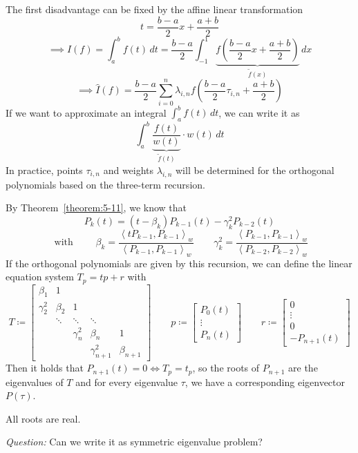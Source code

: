 \documentclass[a4paper]{article}
\numberwithin{lecref}{section}
\theoremstyle{break}
\newcommand{\IP}[2]{\left\langle#1, #2\right\rangle}
\begin{document}
The first disadvantage can be fixed by the affine linear transformation
\[ t = \frac{b - a}{2} x + \frac{a + b}{2} \]
\[ \implies I(f) = \int_a^b f(t) \, dt = \frac{b - a}{2} \int_{-1}^1 \underbrace{f\left(\frac{b - a}{2} x + \frac{a + b}{2}\right)}_{\tilde f(x)} \, dx \]
\[ \implies \hat{I}(f) = \frac{b - a}{2} \sum_{i=0}^n \lambda_{i,n} f\left(\frac{b - a}{2} \tau_{i,n} + \frac{a + b}{2}\right) \]
If we want to approximate an integral $\int_a^b f(t) \, dt$, we can write it as
\[ \int_a^b \underbrace{\frac{f(t)}{w(t)}}_{\tilde f(t)} \cdot w(t) \, dt \]
In practice, points $\tau_{i,n}$ and weights $\lambda_{i,n}$ will be determined for the orthogonal polynomials based on the three-term recursion.

By Theorem~\ref{theorem:5-11}, we know that
\[ P_k(t) = (t - \beta_k) P_{k-1}(t) - \gamma_k^2 P_{k-2}(t) \]
\[ \text{ with } \qquad \beta_k = \frac{\IP{t P_{k-1}}{P_{k-1}}_w}{\IP{P_{k-1}}{P_{k-1}}_w} \qquad \gamma_k^2 = \frac{\IP{P_{k-1}}{P_{k-1}}_w}{\IP{P_{k-2}}{P_{k-2}}_w} \]
If the orthogonal polynomials are given by this recursion, we can define the linear equation system $T_p = t p + r$ with
\[
  T \coloneqq \begin{bmatrix}
    \beta_1    & 1       &            &                & \\
    \gamma_2^2 & \beta_2 & 1          &                & \\
               & \ddots  & \ddots     & \ddots         & \\
               &         & \gamma_n^2 & \beta_n        & 1 \\
               &         &            & \gamma_{n+1}^2 & \beta_{n+1}
  \end{bmatrix}
  \qquad p \coloneqq \begin{bmatrix} P_0(t) \\ \vdots \\ P_n(t) \end{bmatrix}
  \qquad r \coloneqq \begin{bmatrix} 0 \\ \vdots \\ 0 \\ -P_{n+1}(t) \end{bmatrix}
\]
Then it holds that $P_{n+1}(t) = 0 \iff T_p = t_p$, so the roots of $P_{n+1}$ are the eigenvalues of $T$ and for every eigenvalue $\tau$, we have a corresponding eigenvector $P(\tau)$.

All roots are real.

\emph{Question:} Can we write it as symmetric eigenvalue problem?
\end{document}
